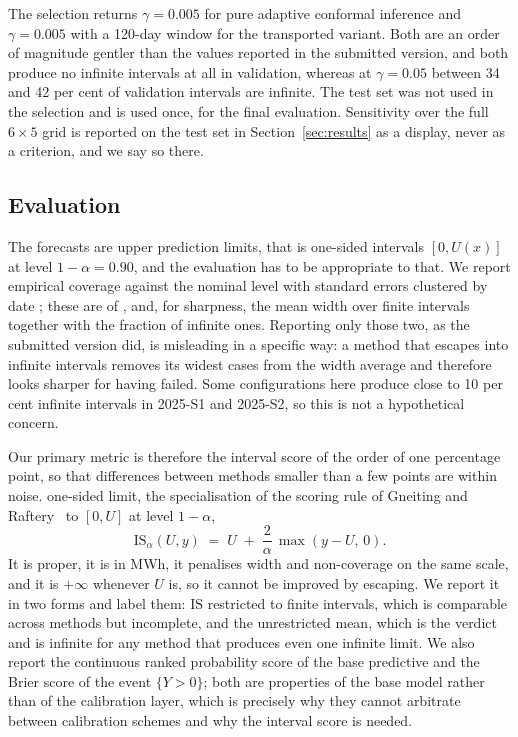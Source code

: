 \documentclass[preprint,3p,times]{elsarticle}
\providecommand{\DIFaddtex}[1]{{\protect\color{blue} \sf #1}} %
\providecommand{\DIFdeltex}[1]{{\protect\color{red} \scriptsize #1}} %
\providecommand{\DIFaddbegin}{} %
\providecommand{\DIFaddend}{} %
\providecommand{\DIFdelbegin}{} %
\providecommand{\DIFdelend}{} %
\providecommand{\DIFadd}[1]{\texorpdfstring{\DIFaddtex{#1}}{#1}} %
\providecommand{\DIFdel}[1]{\texorpdfstring{\DIFdeltex{#1}}{}} %
\begin{document}
\DIFadd{The selection returns $\gamma=0.005$ for pure adaptive conformal inference and $\gamma=0.005$ with a 120-day window for the transported variant. Both are an order of magnitude gentler than the values reported in the submitted version, and both produce no infinite intervals at all in validation, whereas at $\gamma=0.05$ between 34 and 42 per cent of validation intervals are infinite. The test set was not used in the selection and is used once, for the final evaluation. Sensitivity over the full $6\times5$ grid is reported on the test set in Section~\ref{sec:results} as a display, never as a criterion, and we say so there.
}

\subsection{Evaluation}
\label{sec:evaluacion}

\DIFadd{The forecasts are upper prediction limits, that is one-sided intervals $[0,U(x)]$ at level $1-\alpha=0.90$, and the evaluation has to be appropriate to that. We report empirical coverage against the nominal level with standard errors }\DIFaddend clustered by date\DIFdelbegin \DIFdel{; these are of }\DIFdelend \DIFaddbegin \DIFadd{, and, for sharpness, the mean width over finite intervals together with the fraction of infinite ones. Reporting only those two, as the submitted version did, is misleading in a specific way: a method that escapes into infinite intervals removes its widest cases from the width average and therefore looks sharper for having failed. Some configurations here produce close to 10 per cent infinite intervals in 2025-S1 and 2025-S2, so this is not a hypothetical concern.
}

\DIFadd{Our primary metric is therefore the interval score of }\DIFaddend the \DIFdelbegin \DIFdel{order of one percentage point, so that differences between methods smaller than a few points are within noise. }\DIFdelend \DIFaddbegin \DIFadd{one-sided limit, the specialisation of the scoring rule of Gneiting and Raftery~\cite{gneiting2007} to $[0,U]$ at level $1-\alpha$,
}\begin{equation}
\mathrm{IS}_\alpha(U,y) \;=\; U \;+\; \frac{2}{\alpha}\,\max(y-U,\,0).
\label{eq:is}
\end{equation}
\DIFadd{It is proper, it is in MWh, it penalises width and non-coverage on the same scale, and it is $+\infty$ whenever $U$ is, so it cannot be improved by escaping. We report it in two forms and label them: $\mathrm{IS}$ restricted to finite intervals, which is comparable across methods but incomplete, and the unrestricted mean, which is the verdict and is infinite for any method that produces even one infinite limit. We also report the continuous ranked probability score of the base predictive and the Brier score of the event $\{Y>0\}$; both are properties of the base model rather than of the calibration layer, which is precisely why they cannot arbitrate between calibration schemes and why the interval score is needed.
}
\end{document}
